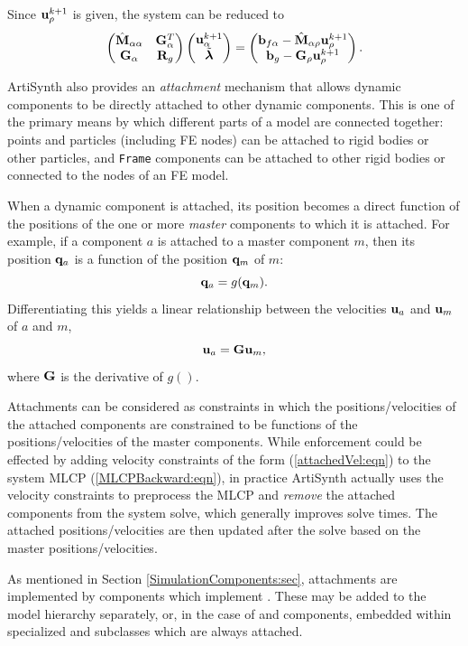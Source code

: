 Since ${\bf u}_\rho^{k+1}$ is given, the system can be reduced to
%
\begin{equation*}
\left(\begin{matrix} 
\hat{\bf M}_{\alpha\alpha} & {\bf G}_{\alpha}^T \\
{\bf G}_{\alpha} & {\bf R}_g \\
\end{matrix}\right)
\left(\begin{matrix} {\bf u}_\alpha^{k+1} \\ \tilde{\boldsymbol\lambda} \end{matrix}\right) =
\left(\begin{matrix} 
{\bf b}_{f\alpha} - \hat{\bf M}_{\alpha\rho} {\bf u}_\rho^{k+1} \\ 
{\bf b}_g - {\bf G}_{\rho} {\bf u}_\rho^{k+1}
\end{matrix}\right).
\end{equation*}
%

ArtiSynth also provides an {\it attachment} mechanism that allows dynamic
components to be directly attached to other dynamic components. This is one of
the primary means by which different parts of a model are connected together:
points and particles (including FE nodes) can be attached to rigid bodies or
other particles, and {\tt Frame} components can be attached to other rigid bodies
or connected to the nodes of an FE model.

When a dynamic component is attached, its position becomes a direct function of
the positions of the one or more {\it master} components to which it is
attached. For example, if a component $a$ is attached to a master component
$m$, then its position ${\bf q}_a$ is a function of the position ${\bf q}_m$ of $m$:
%
\begin{equation*}
{\bf q}_a = g ({\bf q}_m).
\end{equation*}
%
Differentiating this yields a linear relationship between the velocities ${\bf u}_a$
and ${\bf u}_m$ of $a$ and $m$,
%
\begin{equation}
{\bf u}_a = {\bf G} {\bf u}_m,
\label{attachedVel:eqn}
\end{equation}
%
where ${\bf G}$ is the derivative of $g()$. 

Attachments can be considered as constraints in which the positions/velocities
of the attached components are constrained to be functions of the
positions/velocities of the master components. While enforcement could be
effected by adding velocity constraints of the form (\ref{attachedVel:eqn}) to
the system MLCP (\ref{MLCPBackward:eqn}), in practice ArtiSynth actually uses
the velocity constraints to preprocess the MLCP and {\it remove} the attached
components from the system solve, which generally improves solve times.  The
attached positions/velocities are then updated after the solve based on the
master positions/velocities.

As mentioned in Section \ref{SimulationComponents:sec}, attachments are
implemented by components which implement
. These may be added
to the model hierarchy separately, or, in the case of
 and 
components, embedded within specialized 
 and 
subclasses which are always attached.

